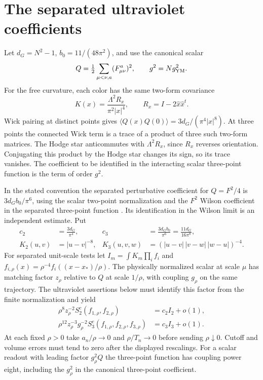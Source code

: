 \documentclass[11pt,letterpaper]{article}
\begin{document}


\section{The separated ultraviolet coefficients}

Let \(d_G=N^2-1\), \(b_0=11/(48\pi^2)\), and use the canonical scalar
\[
 Q=\tfrac12\sum_{\mu<\nu,a}(F^a_{\mu\nu})^2,\qquad g^2=N g_{\rm YM}^2 .
\]
For the free curvature, each color has the same two-form covariance
\[
 K(x)=\frac{\Lambda^2R_x}{\pi^2|x|^4},
 \qquad R_x=I-2\widehat x\widehat x^{t}.
\] Wick pairing at distinct points
gives \(\langle Q(x)Q(0)\rangle=3d_G/(\pi^4|x|^8)\).
At three points the connected Wick term is a trace of a product of
three such two-form matrices. The Hodge star anticommutes with
\(\Lambda^2R_x\), since \(R_x\) reverses orientation. Conjugating this
product by the Hodge star changes its sign, so its trace vanishes.
The coefficient to be identified in the interacting scalar three-point function is the term of order \(g^2\).

In the stated convention the separated perturbative coefficient for
\(Q=F^2/4\) is \(3d_G b_0/\pi^6\), using the scalar two-point normalization
and the \(F^2\) Wilson coefficient in the separated three-point function
\cite{BB,BP}. Its identification in the Wilson limit is an independent
estimate. Put
\[
 \begin{aligned}
 c_2&=\frac{3d_G}{\pi^4},&
 c_3&=\frac{3d_G b_0}{\pi^6}=\frac{11d_G}{16\pi^8},\\
 K_2(u,v)&=|u-v|^{-8},&
 K_3(u,v,w)&=(|u-v|\,|v-w|\,|w-u|)^{-4}.
 \end{aligned}
\]
For separated unit-scale tests let \(I_m=\int K_m\prod_i f_i\) and
\(f_{i,\rho}(x)=\rho^{-4}f_i((x-x_*)/\rho)\). The physically normalized
scalar at scale \(\mu\) has matching factor \(z_\rho\) relative to \(Q\)
at scale \(1/\rho\), with coupling \(g_\rho\) on the same trajectory.
The ultraviolet assertions below must identify this factor from the
finite normalization and yield
\[
\begin{aligned}
 \rho^8 z_\rho^{-2} S_2^c(f_{1,\rho},f_{2,\rho})
      &= c_2 I_2+o(1),\\
 \rho^{12} z_\rho^{-3}g_\rho^{-2}
       S_3^c(f_{1,\rho},f_{2,\rho},f_{3,\rho})
      &= c_3 I_3+o(1).
\end{aligned}
\]
At each fixed \(\rho>0\) take \(a_n/\rho\to0\) and \(\rho/T_n\to0\)
before sending \(\rho\downarrow0\). Cutoff and volume errors must tend
to zero after the displayed rescalings. For a scalar readout with
leading factor \(g_\rho^2 Q\) the three-point function has coupling
power eight, including the \(g_\rho^2\) in the canonical three-point
coefficient.
\end{document}
